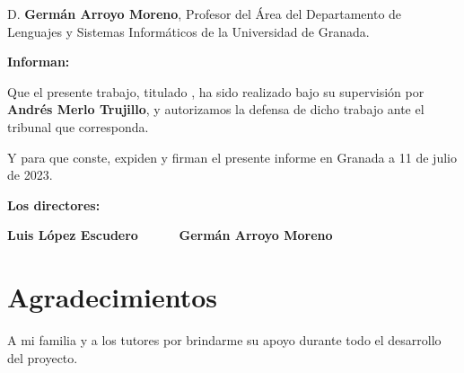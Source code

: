 D. \textbf{Germán Arroyo Moreno}, Profesor del Área del Departamento de Lenguajes y Sistemas Informáticos de la Universidad de Granada.


\vspace{0.5cm}

\textbf{Informan:}

\vspace{0.5cm}

Que el presente trabajo, titulado \textit{\textbf{\myTitle}},
ha sido realizado bajo su supervisión por \textbf{Andrés Merlo Trujillo}, y autorizamos la defensa de dicho trabajo ante el tribunal
que corresponda.

\vspace{0.5cm}

Y para que conste, expiden y firman el presente informe en Granada a 11 de julio de 2023.

\vspace{1cm}

\textbf{Los directores:}

\vspace{5cm}

\noindent \textbf{Luis López Escudero \ \ \ \ \ Germán Arroyo Moreno}

\chapter*{Agradecimientos}
\thispagestyle{empty}

       \vspace{1cm}


A mi familia y a los tutores por brindarme su apoyo durante todo el desarrollo del proyecto.


